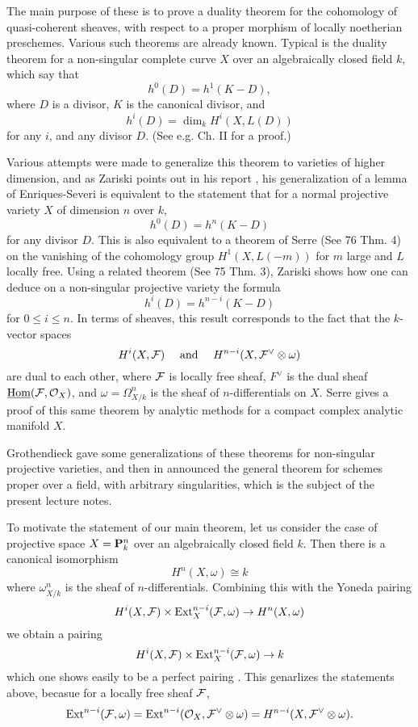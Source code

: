 The main purpose of these is to prove a duality theorem for the cohomology of quasi-coherent sheaves, with respect to a proper morphism of locally noetherian preschemes. Various such theorems are already known. Typical is the duality theorem for a non-singular complete curve $X$ over an algebraically closed field $k$, which say that
\[h^0(D)=h^1(K-D),\]
where $D$ is a divisor, $K$ is the canonical divisor, and 
\[h^{i}(D)=\dim_k H^i(X,L(D))\]
for any $i$, and any divisor $D$. (See e.g. \cite{s1959} Ch. II for a proof.) \par

Various attempts were made to generalize this theorem to varieties of higher dimension, and as Zariski points out in his report \cite{report1956}, his generalization of a lemma of Enriques-Severi \cite{z1952} is equivalent to the statement that for a normal projective variety $X$ of dimension $n$ over $k$,
\[h^0(D)=h^n(K-D)\]
for any divisor $D$. This is also equivalent to a theorem of Serre (See \cite{fac} 76 Thm. 4) on the vanishing of the cohomology group $H^1(X,L(-m))$ for $m$ large and $L$ locally free. Using a related theorem (See \cite{fac} 75 Thm. 3), Zariski shows how one can deduce on a non-singular projective variety the formula
\[h^i(D)=h^{n-i}(K-D)\]
for $0\leq i\leq n$. In terms of sheaves, this result corresponds to the fact that the $k$-vector spaces
\[H^i(X,\mathcal{F})\quad \textrm{ and } \quad H^{n-i}(X,\mathcal{F}^{\vee}\otimes \omega)\]
are dual to each other, where $\mathcal{F}$ is locally free sheaf, $F^{\vee}$ is the dual sheaf $\underline{\mathrm{Hom}}(\mathcal{F},\mathcal{O}_X)$, and $\omega=\Omega^n_{X/k}$ is the sheaf of $n$-differentials on $X$. Serre gives a proof of this same theorem by analytic methods for a compact complex analytic manifold $X$.\par

Grothendieck gave some generalizations of these theorems for non-singular projective varieties, and then in \cite{} announced the general theorem for schemes proper over a field, with arbitrary singularities, which is the subject of the present lecture notes.\par 

To motivate the statement of our main theorem, let us consider the case of projective space $X=\mathbf{P}^n_k$ over an algebraically closed field $k$. Then there is a canonical isomorphism
\[H^n(X,\omega)\cong k\]
where $\omega^n_{X/k}$ is the sheaf of $n$-differentials. Combining this with the Yoneda pairing
\[H^i(X,\mathcal{F})\times \mathrm{Ext}_X^{n-i}(\mathcal{F},\omega)\rightarrow H^n(X,\omega)\]
we obtain a pairing
\[H^i(X,\mathcal{F})\times \mathrm{Ext}^{n-i}_X(\mathcal{F},\omega)\rightarrow k\]
which one shows easily to be a perfect pairing \cite{}. This genarlizes the statements above, becasue for a locally free sheaf $\mathcal{F}$,
\[\mathrm{Ext}^{n-i}(\mathcal{F},\omega)=\mathrm{Ext}^{n-i}(\mathcal{O}_X,\mathcal{F}^{\vee}\otimes \omega)=H^{n-i}(X,\mathcal{F}^{\vee}\otimes \omega).\]
